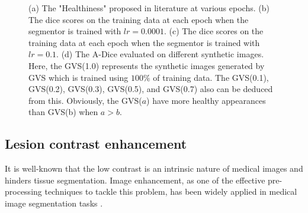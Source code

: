\documentclass[journal,twoside,web]{ieeecolor}
\begin{document}
\begin{figure}
	\centering
	\caption{(a) The "Healthiness" proposed in literature \cite{xia2020pseudo} at various epochs. (b) The dice scores on the training data at each epoch when the segmentor is trained with $lr=0.0001$. (c)  The dice scores on the training data at each epoch when the segmentor is trained with $lr=0.1$. (d) The A-Dice evaluated on different synthetic images. Here, the GVS(1.0) represents the synthetic images generated by GVS which is trained using $100\%$ of training data. The GVS(0.1), GVS(0.2), GVS(0.3), GVS(0.5), and GVS(0.7) also can be deduced from this. Obviously, the GVS($a$) have more healthy appearances than GVS(b) when $a>b$.}\label{fig3}
\end{figure}

\subsection{Lesion contrast enhancement}
\label{subsection:enhancement}
It is well-known that the low contrast is an intrinsic nature of medical images and hinders tissue segmentation. Image enhancement, as one of the effective pre-processing techniques to tackle this problem, has been widely applied in medical image segmentation tasks \cite{vasuki2017survey}. 
\end{document}
